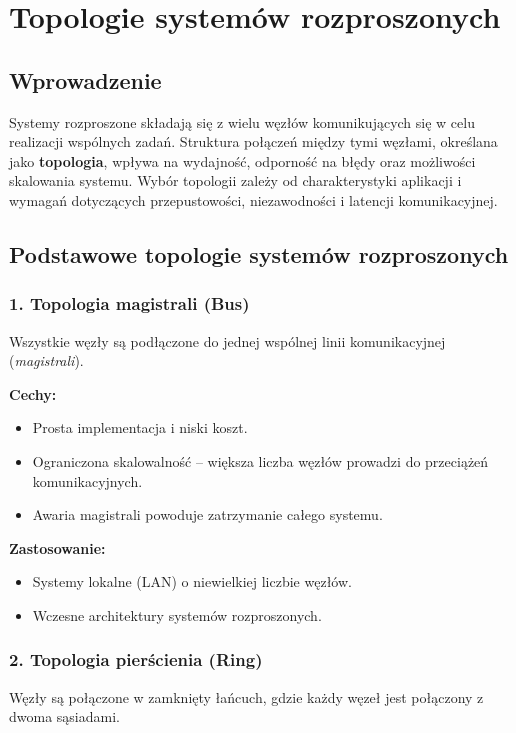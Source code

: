 \section{Topologie systemów rozproszonych}

\subsection{Wprowadzenie}
Systemy rozproszone składają się z wielu węzłów komunikujących się w celu realizacji wspólnych zadań. Struktura połączeń między tymi węzłami, określana jako \textbf{topologia}, wpływa na wydajność, odporność na błędy oraz możliwości skalowania systemu. Wybór topologii zależy od charakterystyki aplikacji i wymagań dotyczących przepustowości, niezawodności i latencji komunikacyjnej.

\subsection{Podstawowe topologie systemów rozproszonych}

\subsubsection{1. Topologia magistrali (Bus)}
Wszystkie węzły są podłączone do jednej wspólnej linii komunikacyjnej (\textit{magistrali}).

\textbf{Cechy:}
\begin{itemize}
    \item Prosta implementacja i niski koszt.
    \item Ograniczona skalowalność – większa liczba węzłów prowadzi do przeciążeń komunikacyjnych.
    \item Awaria magistrali powoduje zatrzymanie całego systemu.
\end{itemize}

\textbf{Zastosowanie:}
\begin{itemize}
    \item Systemy lokalne (LAN) o niewielkiej liczbie węzłów.
    \item Wczesne architektury systemów rozproszonych.
\end{itemize}

\subsubsection{2. Topologia pierścienia (Ring)}
Węzły są połączone w zamknięty łańcuch, gdzie każdy węzeł jest połączony z dwoma sąsiadami.

